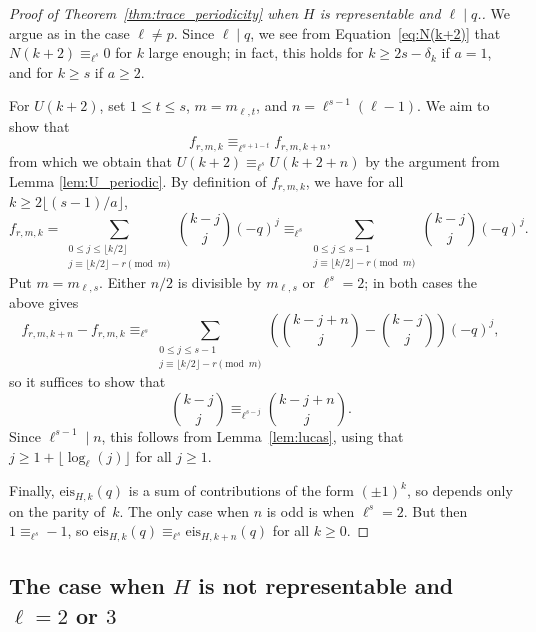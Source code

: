 \documentclass[10pt]{article}
\theoremstyle{definition}
\renewcommand{\:}{\colon}
\begin{document}
\begin{proof}[Proof of Theorem~\ref{thm:trace_periodicity} when $H$ is representable and $\ell \mid q$.]
    We argue as in the case $\ell \neq p$. Since $\ell \mid q$, we see from Equation~\eqref{eq:N(k+2)} that $N(k+2) \equiv_{\ell^s} 0$ for $k$ large enough; in fact, this holds for $k \geq 2s-\delta_k$ 
    if $a = 1$, and for $k \geq s$ if $a \geq 2$.
    
    For $U(k+2)$, set $1 \leq t \leq s$, $m = m_{\ell,t}$, and $n =
    \ell^{s-1}(\ell-1)$. We aim to show that
    \begin{equation}\label{eq:l=p-congruence}
    f_{r,m,k} \equiv_{\ell^{s+1-t}} f_{r,m,k+n},
    \end{equation}
    from which we obtain that $U(k+2) \equiv_{\ell^s} U(k+2+n)$ by the argument from Lemma \ref{lem:U_periodic}.
    By definition of $f_{r,m,k}$, we have for all $k \geq 2\lfloor (s-1)/a \rfloor$,
    \[
    f_{r,m,k} = \sum_{\substack{0 \leq j \leq \lfloor k/2 \rfloor \\ j \equiv \lfloor k/2 \rfloor -r \pmod{m} }} \binom{k-j}{j} (-q)^{j} \equiv_{\ell^s} \sum_{\substack{0 \leq j \leq s-1 \\ j \equiv \lfloor k/2 \rfloor -r \pmod{m} }} \binom{k-j}{j} (-q)^{j}.
    \]
    Put $m=m_{\ell,s}$. Either $n/2$ is divisible by $m_{\ell,s}$ or $\ell^s = 2$; in both cases the above gives 
    \[
    f_{r,m,k+n} - f_{r,m,k} \equiv_{\ell^s} \sum_{\substack{0 \leq j \leq s-1 \\ j \equiv \lfloor k/2 \rfloor -r \pmod{m} }} \left( \binom{k-j+n}{j} - \binom{k-j}{j} \right) (-q)^{j},
    \]
    so it suffices to show that
    \[
    \binom{k-j}{j} \equiv_{\ell^{s-j}} \binom{k-j+n}{j}.
    \]
    Since $\ell^{s-1} \mid n$, this follows from Lemma~\ref{lem:lucas}, using that $j \geq 1 + \lfloor \log_\ell(j)\rfloor$ for all $j \geq 1$. 

    Finally, $\mathrm{eis}_{H,k}(q)$ is a sum of contributions of the form $(\pm 1)^k$, so depends only on the parity of~$k$. The only case when $n$ is odd is when $\ell^s = 2$. But then $1 \equiv_{\ell^s} -1$, so $\mathrm{eis}_{H,k}(q)\equiv_{\ell^s} \mathrm{eis}_{H,k+n}(q)$ for all $k\geq 0$.
\end{proof}

\subsection{The case when $H$ is not representable and \texorpdfstring{$\ell=2$ or $3$}{ell23}} \label{sec-notrepresentable}
\end{document}
